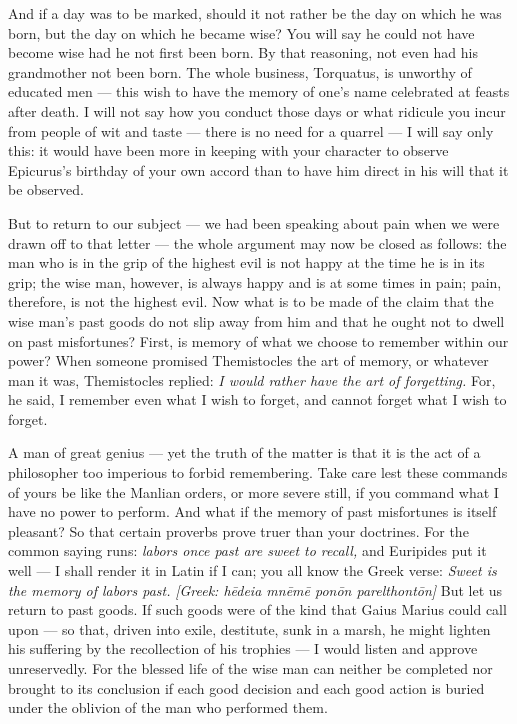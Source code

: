  And if a day was to be marked, should it not rather be the day on which he was born, but the day on which he became wise? You will say he could not have become wise had he not first been born. By that reasoning, not even had his grandmother not been born. The whole business, Torquatus, is unworthy of educated men — this wish to have the memory of one's name celebrated at feasts after death. I will not say how you conduct those days or what ridicule you incur from people of wit and taste — there is no need for a quarrel — I will say only this: it would have been more in keeping with your character to observe Epicurus's birthday of your own accord than to have him direct in his will that it be observed.

 But to return to our subject — we had been speaking about pain when we were drawn off to that letter — the whole argument may now be closed as follows: the man who is in the grip of the highest evil is not happy at the time he is in its grip; the wise man, however, is always happy and is at some times in pain; pain, therefore, is not the highest evil. Now what is to be made of the claim that the wise man's past goods do not slip away from him and that he ought not to dwell on past misfortunes? First, is memory of what we choose to remember within our power? When someone promised Themistocles the art of memory, or whatever man it was, Themistocles replied: \textit{I would rather have the art of forgetting.} For, he said, I remember even what I wish to forget, and cannot forget what I wish to forget.

 A man of great genius — yet the truth of the matter is that it is the act of a philosopher too imperious to forbid remembering. Take care lest these commands of yours be like the Manlian orders, or more severe still, if you command what I have no power to perform. And what if the memory of past misfortunes is itself pleasant? So that certain proverbs prove truer than your doctrines. For the common saying runs: \textit{labors once past are sweet to recall,} and Euripides put it well — I shall render it in Latin if I can; you all know the Greek verse: \textit{Sweet is the memory of labors past.} \textit{[Greek: hēdeia mnēmē ponōn parelthontōn]} But let us return to past goods. If such goods were of the kind that Gaius Marius could call upon — so that, driven into exile, destitute, sunk in a marsh, he might lighten his suffering by the recollection of his trophies — I would listen and approve unreservedly. For the blessed life of the wise man can neither be completed nor brought to its conclusion if each good decision and each good action is buried under the oblivion of the man who performed them.


